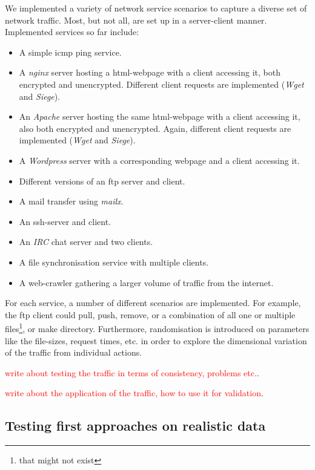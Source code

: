 \documentclass[a4paper,12pt,twoside]{report}
\begin{document}
We implemented a variety of network service  scenarios to capture a diverse set of network traffic. Most, but not all, are set up in a server-client manner. Implemented services so far include:

\begin{itemize}
\item A simple icmp ping service.
\item A \textit{nginx} server hosting a html-webpage with a client accessing it, both encrypted and unencrypted. Different client requests are implemented (\textit{Wget} and \textit{Siege}).
\item An \textit{Apache} server hosting the same html-webpage with a client accessing it, also both encrypted and unencrypted. Again, different client requests are implemented (\textit{Wget} and \textit{Siege}).
\item A \textit{Wordpress} server with a corresponding webpage and a client accessing it.
\item Different versions of an ftp server and client.
\item A mail transfer using \textit{mailx}.
\item An ssh-server and client.
\item An \textit{IRC} chat server and two clients.
\item A file synchronisation service with multiple clients.
\item A web-crawler gathering a larger volume of traffic from the internet.
\end{itemize}

For each service, a number of different scenarios are implemented. For example, the ftp client could pull, push, remove, or a combination of all one or multiple files\footnote{that might not exist}, or make directory. Furthermore, randomisation is introduced on parameters like the file-sizes, request times, etc. in order to explore the dimensional variation of the traffic from individual actions.

\textcolor{red}{write about testing the traffic in terms of consistency, problems etc.}.


\textcolor{red}{write about the application of the traffic, how to use it for validation}.


\subsection{Testing first approaches on realistic data}
\end{document}
